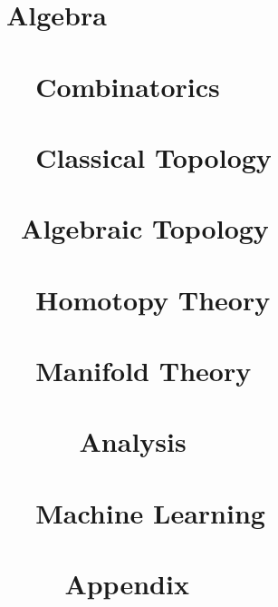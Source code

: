 

\part{Algebra}





\part{~~Combinatorics}



\part{~~Classical Topology}



\part{~Algebraic Topology}



\part{~~Homotopy Theory}



\part{~~Manifold Theory}



\part{~~~~~Analysis}





\part{~~Machine Learning}



\appendix

\part{~~~~Appendix}


% 

\printbibliography


